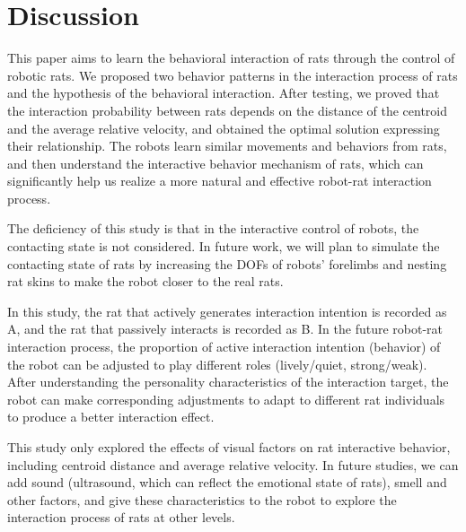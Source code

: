 \section{Discussion}
This paper aims to learn the behavioral interaction of rats through the control of robotic rats. We proposed two behavior patterns in the interaction process of rats and the hypothesis of the behavioral interaction. After testing, we proved that the interaction probability between rats depends on the distance of the centroid and the average relative velocity, and obtained the optimal solution expressing their relationship. The robots learn similar movements and behaviors from rats, and then understand the interactive behavior mechanism of rats, which can significantly help us realize a more natural and effective robot-rat interaction process.

The deficiency of this study is that in the interactive control of robots, the contacting state is not considered. In future work, we will plan to simulate the contacting state of rats by increasing the DOFs of robots' forelimbs and nesting rat skins to make the robot closer to the real rats.

In this study, the rat that actively generates interaction intention is recorded as A, and the rat that passively interacts is recorded as B. In the future robot-rat interaction process, the proportion of active interaction intention (behavior) of the robot can be adjusted to play different roles (lively/quiet, strong/weak). After understanding the personality characteristics of the interaction target, the robot can make corresponding adjustments to adapt to different rat individuals to produce a better interaction effect.

This study only explored the effects of visual factors on rat interactive behavior, including centroid distance and average relative velocity. In future studies, we can add sound (ultrasound, which can reflect the emotional state of rats), smell and other factors, and give these characteristics to the robot to explore the interaction process of rats at other levels.
